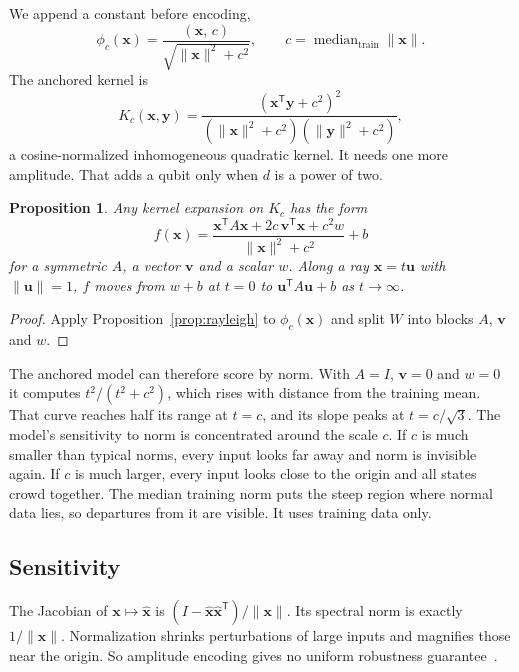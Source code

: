 \documentclass[pdflatex,sn-mathphys-num,lineno]{sn-jnl}
\theoremstyle{thmstyleone}
\newtheorem{proposition}{Proposition}
\begin{document}
We append a constant before encoding,
\begin{equation}
\phi_c(\mathbf{x}) = \frac{(\mathbf{x},\,c)}{\sqrt{\|\mathbf{x}\|^2+c^2}},
\qquad c=\operatorname{median}_{\mathrm{train}}\|\mathbf{x}\| .
\label{eq:anchor}
\end{equation}
The anchored kernel is
\begin{equation}
K_c(\mathbf{x},\mathbf{y}) = \frac{(\mathbf{x}^{\mathsf{T}}\mathbf{y}+c^2)^2}
{(\|\mathbf{x}\|^2+c^2)(\|\mathbf{y}\|^2+c^2)} ,
\label{eq:kc}
\end{equation}
a cosine-normalized inhomogeneous quadratic kernel. It needs one more amplitude.
That adds a qubit only when $d$ is a power of two.

\begin{proposition}\label{prop:anchor}
Any kernel expansion on $K_c$ has the form
\begin{equation}
f(\mathbf{x}) = \frac{\mathbf{x}^{\mathsf{T}}A\mathbf{x}+2c\,\mathbf{v}^{\mathsf{T}}\mathbf{x}+c^2 w}
{\|\mathbf{x}\|^2+c^2} + b
\end{equation}
for a symmetric $A$, a vector $\mathbf{v}$ and a scalar $w$. Along a ray
$\mathbf{x}=t\mathbf{u}$ with $\|\mathbf{u}\|=1$, $f$ moves from $w+b$ at $t=0$ to
$\mathbf{u}^{\mathsf{T}}A\mathbf{u}+b$ as $t\to\infty$.
\end{proposition}
\begin{proof}
Apply Proposition~\ref{prop:rayleigh} to $\phi_c(\mathbf{x})$ and split $W$ into
blocks $A$, $\mathbf{v}$ and $w$.
\end{proof}

The anchored model can therefore score by norm. With $A=I$, $\mathbf{v}=0$ and
$w=0$ it computes $t^2/(t^2+c^2)$, which rises with distance from the training
mean. That curve reaches half its range at $t=c$, and its slope peaks at
$t=c/\sqrt{3}$. The model's sensitivity to norm is concentrated around the scale
$c$. If $c$ is much smaller than typical norms, every
input looks far away and norm is invisible again. If $c$ is much larger, every
input looks close to the origin and all states crowd together. The median
training norm puts the steep region where normal data lies, so departures from it
are visible. It uses training data only.

\subsection{Sensitivity}

The Jacobian of $\mathbf{x}\mapsto\hat{\mathbf{x}}$ is
$(I-\hat{\mathbf{x}}\hat{\mathbf{x}}^{\mathsf{T}})/\|\mathbf{x}\|$. Its spectral norm
is exactly $1/\|\mathbf{x}\|$. Normalization shrinks perturbations of large inputs
and magnifies those near the origin. So amplitude encoding gives no uniform
robustness guarantee~\cite{larose2020robust}.
\end{document}
